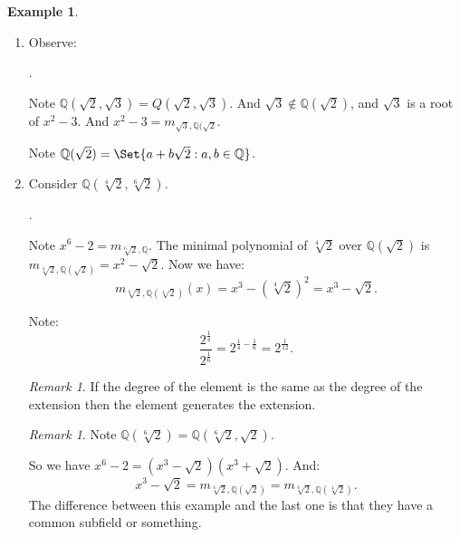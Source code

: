 \documentclass[9pt,reqno,twoside]{amsbook}
\theoremstyle{plain}
\numberwithin{section}{chapter}
\numberwithin{equation}{chapter}
\theoremstyle{definition}
\newtheorem{Ex}[theorem]{Example}
\theoremstyle{remark}
\newtheorem{rem}[theorem]{Remark}
\theoremstyle{plain}
\newcommand{\Q}{\mathbb{Q}}
\newcommand{\fracc}{\frac}
\begin{document}
\begin{Ex}
\begin{enumerate}
\item Observe:
\begin{center}
.
\end{center}
Note $\Q(\sqrt{2},\sqrt{3}) = Q(\sqrt{2},\sqrt{3})$. And $\sqrt{3} \notin \Q(\sqrt{2})$, and $\sqrt{3}$ is a root of $x^2 - 3$. And $x^2 - 3 = m_{\sqrt{3},\Q(\sqrt{2}}$. 

Note $\Q(\sqrt{2}) = \Set{a + b\sqrt{2}: a,b\in \Q}$. 

\item Consider $\Q(\sqrt[4]{2}, \sqrt[6]{2})$. 
\begin{center}
.
\end{center}
Note $x^6 - 2 = m_{\sqrt[6]{2},\Q}$. 
The minimal polynomial of $\sqrt[4]{2}$ over $\Q(\sqrt{2})$ is $m_{\sqrt[4]{2},\Q(\sqrt{2})} = x^2 - \sqrt{2}$. Now we have: 
$$
m_{\sqrt[6]{2},\Q(\sqrt[4]{2})}(x) = x^3 - (\sqrt[4]{2})^2 = x^3 - \sqrt{2}.
$$

Note:
$$
\fracc{2^{\fracc{1}{4}}}{2^{\fracc{1}{6}}} = 2^{\fracc{1}{4} - \fracc{1}{6}} = 2^{\fracc{1}{12}}.
$$

\begin{rem}
If the degree of the element is the same as the degree of the extension then the element generates the extension. 
\end{rem}

\begin{rem}
Note $\Q(\sqrt[6]{2}) = \Q(\sqrt[6]{2},\sqrt{2})$. 
\end{rem}

So we have $x^6 - 2  = (x^3 - \sqrt{2})(x^3 + \sqrt{2})$. And:
$$
x^3 - \sqrt{2} = m_{\sqrt[6]{2},\Q(\sqrt{2})} =  m_{\sqrt[6]{2},\Q(\sqrt[4]{2})}.
$$
The difference between this example and the last one is that they have a common subfield or something. 


\end{enumerate}
\end{Ex}
\end{document}
